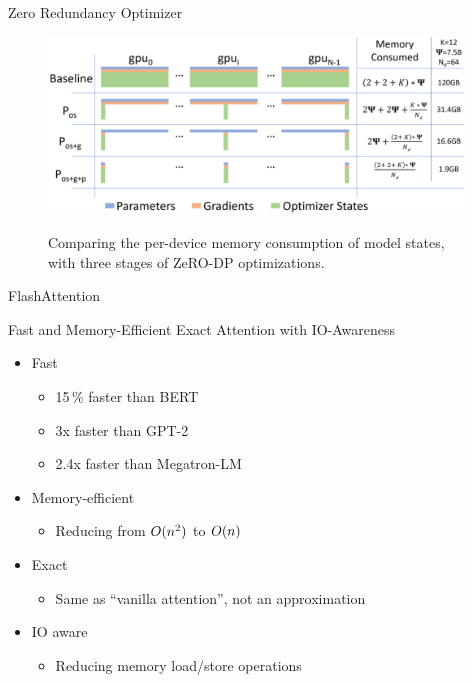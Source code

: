 
\begin{vbframe}{Zero Redundancy Optimizer}

\vfill

\begin{figure}
	\centering
	\includegraphics[width = 11cm]{./figure/zero_paralel.png} \\ 
 \caption{Comparing the per-device memory consumption of model states, with three stages of ZeRO-DP optimizations.}
  
\end{figure}

\vfill

\end{vbframe}


\begin{vbframe}{F\MakeLowercase{lash}A\MakeLowercase{ttention}}

\vfill

Fast and Memory-Efficient Exact Attention with IO-Awareness \newline

\begin{itemize}
	\item Fast
	\begin{itemize}
		\item 15\,\% faster than BERT
		\item 3x faster than GPT-2 
		\item 2.4x faster than Megatron-LM
	\end{itemize}
	\item Memory-efficient
	\begin{itemize}
		\item Reducing from $O(\MakeLowercase{n}^2)$ to $O(\MakeLowercase{n})$ 
	\end{itemize}
	\item Exact
	\begin{itemize}
		\item Same as ``vanilla attention'', not an approximation 
	\end{itemize}
	\item IO aware
	\begin{itemize}
		\item Reducing memory load/store operations
	\end{itemize}
\end{itemize}

\vfill

\end{vbframe}

